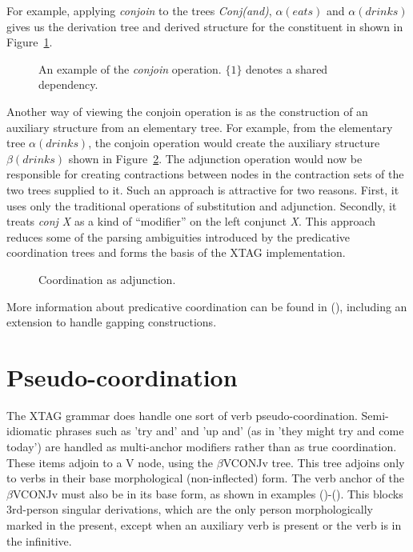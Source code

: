 For example, applying {\em conjoin\/} to the trees {\em Conj(and)},
$\alpha(eats)$ and $\alpha(drinks)$ gives us the derivation tree and
derived structure for the constituent in  shown in
Figure~\ref{fig:vpc}.


\begin{figure}[htbp]
  \begin{center}
    \leavevmode
  \end{center}
  \caption{An example of the {\em conjoin\/} operation. $\{1\}$
    denotes a shared dependency.}
  \label{fig:vpc}
\end{figure}

Another way of viewing the conjoin operation is as the construction of
an auxiliary structure from an elementary tree. For example, from the
elementary tree $\alpha(drinks)$, the conjoin operation would create
the auxiliary structure $\beta(drinks)$ shown in
Figure~\ref{fig:aux-conj}. The adjunction operation would now be
responsible for creating contractions between nodes in the contraction
sets of the two trees supplied to it. Such an approach is attractive
for two reasons. First, it uses only the traditional operations of
substitution and adjunction. Secondly, it treats {\em conj X} as a
kind of ``modifier'' on the left conjunct {\em X}. This approach
reduces some of the parsing ambiguities introduced by the predicative
coordination trees and forms the basis of the XTAG implementation.

\begin{figure}[htbp]
  \begin{center}
    \leavevmode
  \end{center}
  \caption{Coordination as adjunction.}
  \label{fig:aux-conj}
\end{figure}

More information about predicative coordination can be found in
(\cite{anoopjoshi96}), including an extension to handle gapping constructions.

\section{Pseudo-coordination}

The XTAG grammar does handle one sort of verb pseudo-coordination. 
Semi-idiomatic phrases such as 'try and' and 'up and' (as in 'they might 
try and come today') are handled as multi-anchor modifiers 
rather than as true coordination. These items adjoin to a V node, using 
the $\beta$VCONJv tree. This tree adjoins only to verbs in their base 
morphological (non-inflected) form. The verb anchor of the $\beta$VCONJv 
must also be in its base form, as shown in examples 
()-(). This blocks 3rd-person singular derivations, 
which are the only person morphologically marked in the present, except when 
an auxiliary verb is present or the verb is in the infinitive.

